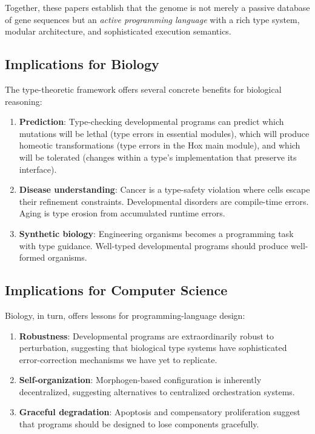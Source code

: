 \documentclass[12pt,a4paper]{article}
\begin{document}
Together, these papers establish that the genome is not merely a
passive database of gene sequences but an \emph{active programming
language} with a rich type system, modular architecture, and
sophisticated execution semantics.

\subsection{Implications for Biology}

The type-theoretic framework offers several concrete benefits for
biological reasoning:

\begin{enumerate}[leftmargin=2em]
  \item \textbf{Prediction}: Type-checking developmental programs
    can predict which mutations will be lethal (type errors in
    essential modules), which will produce homeotic transformations
    (type errors in the Hox main module), and which will be tolerated
    (changes within a type's implementation that preserve its interface).
  \item \textbf{Disease understanding}: Cancer is a type-safety
    violation where cells escape their refinement constraints.
    Developmental disorders are compile-time errors.  Aging is
    type erosion from accumulated runtime errors.
  \item \textbf{Synthetic biology}: Engineering organisms becomes
    a programming task with type guidance.  Well-typed developmental
    programs should produce well-formed organisms.
\end{enumerate}

\subsection{Implications for Computer Science}

Biology, in turn, offers lessons for programming-language design:

\begin{enumerate}[leftmargin=2em]
  \item \textbf{Robustness}: Developmental programs are extraordinarily
    robust to perturbation, suggesting that biological type systems
    have sophisticated error-correction mechanisms we have yet to
    replicate.
  \item \textbf{Self-organization}: Morphogen-based configuration is
    inherently decentralized, suggesting alternatives to centralized
    orchestration systems.
  \item \textbf{Graceful degradation}: Apoptosis and compensatory
    proliferation suggest that programs should be designed to lose
    components gracefully.
\end{enumerate}
\end{document}
